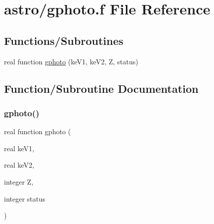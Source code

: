 \hypertarget{gphoto_8f}{}\section{astro/gphoto.f File Reference}
\label{gphoto_8f}
\subsection*{Functions/\+Subroutines}
\begin{DoxyCompactItemize}
\item 
real function \hyperlink{gphoto_8f_ad5a619862d3c5c555dcd03e4ee8d88b8}{gphoto} (ke\+V1, ke\+V2, Z, status)
\end{DoxyCompactItemize}


\subsection{Function/\+Subroutine Documentation}
\mbox{\label{gphoto_8f_ad5a619862d3c5c555dcd03e4ee8d88b8}} 
\subsubsection{\texorpdfstring{gphoto()}{gphoto()}}
{\footnotesize\ttfamily real function gphoto (\begin{DoxyParamCaption}\item[{real}]{ke\+V1,  }\item[{real}]{ke\+V2,  }\item[{integer}]{Z,  }\item[{integer}]{status }\end{DoxyParamCaption})}

